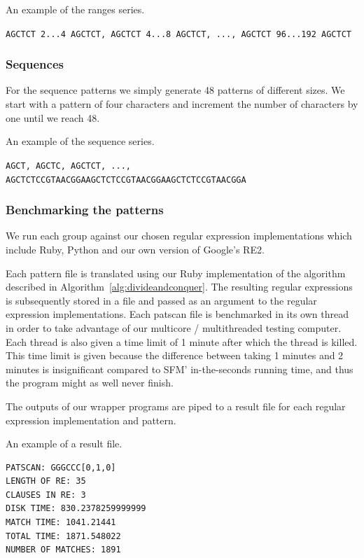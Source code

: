 \documentclass[12pt]{article}
\theoremstyle{definition}
\begin{document}
\begin{example}
An example of the ranges series.

\begin{center}
\texttt{AGCTCT 2...4 AGCTCT, AGCTCT 4...8 AGCTCT, ..., AGCTCT 96...192 AGCTCT}
\end{center}
\end{example}

\subsubsection{Sequences}

For the sequence patterns we simply generate 48 patterns of different sizes. We start with a pattern of four characters and increment the number of characters by one until we reach 48.

\begin{example}
An example of the sequence series.

\begin{center}
\texttt{AGCT, AGCTC, AGCTCT, ..., AGCTCTCCGTAACGGAAGCTCTCCGTAACGGAAGCTCTCCGTAACGGA}
\end{center}
\end{example}

\subsubsection{Benchmarking the patterns}

We run each group against our chosen regular expression implementations which include Ruby, Python and our own version of Google's RE2.
 
Each pattern file is translated using our Ruby implementation of the algorithm described in Algorithm~\ref{alg:divideandconquer}. The resulting regular expressions is subsequently stored in a file and passed as an argument to the regular expression implementations. Each patscan file is benchmarked in its own thread in order to take advantage of our multicore / multithreaded testing computer. Each thread is also given a time limit of 1 minute after which the thread is killed. This time limit is given because the difference between taking 1 minutes and 2 minutes is insignificant compared to SFM' in-the-seconds running time, and thus the program might as well never finish.

The outputs of our wrapper programs are piped to a result file for each regular expression implementation and pattern.

\begin{example} 
An example of a result file.
\begin{verbatim}
PATSCAN: GGGCCC[0,1,0]
LENGTH OF RE: 35
CLAUSES IN RE: 3
DISK TIME: 830.2378259999999
MATCH TIME: 1041.21441
TOTAL TIME: 1871.548022
NUMBER OF MATCHES: 1891
\end{verbatim}
\end{example}
\end{document}
